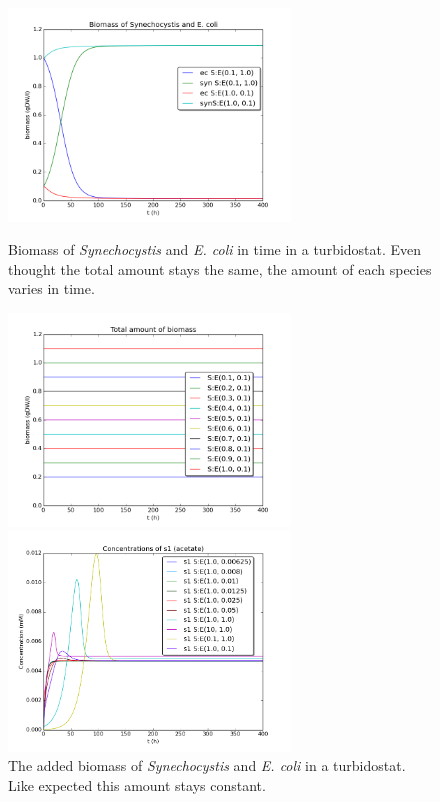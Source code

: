 \documentclass[10pt]{report}
\begin{document}
\begin{figure}[htbp]
  \hfill
  \begin{minipage}[t]{.45\textwidth}
 \begin{center}  
     \includegraphics[width=7.5cm]{sub_dependent_turb_biomassex.png}
     \caption{Biomass of \textit{Synechocystis} and \textit{E. coli} in time in a turbidostat. Even thought the total amount stays the same, the amount of each species varies in time.}
    \label{fig:subturbbex}
    \end{center}
  \end{minipage}
  \hfill
  \begin{minipage}[t]{.45\textwidth}
    \begin{center}  
     \includegraphics[width=7.5cm]{total_biomass1.png}
     \caption{The added biomass of \textit{Synechocystis} and \textit{E. coli} in a turbidostat. Like expected this amount stays constant.}
    \label{fig:subturbtb}
    \end{center}
  \end{minipage}
  \hfill
  \begin{minipage}{.45\textwidth}
   \begin{center}
         \includegraphics[width=7.5cm]{S1.png}

\end{center}
\end{minipage}
\end{figure}
\end{document}
